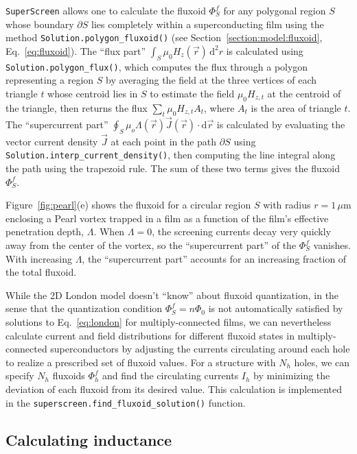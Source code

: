 \documentclass[final,3p,times,twocolumn]{elsarticle}
\newcommand{\inline}[1]{\texttt{#1}\xspace}
\newcommand{\SuperScreen}{\inline{SuperScreen}}
\newcommand{\um}{\mu\mathrm{m}}
\begin{document}
\SuperScreen allows one to calculate the fluxoid $\Phi^f_S$ for any polygonal region $S$ whose boundary $\partial S$ lies completely within a superconducting film using the method \inline{Solution.polygon_fluxoid()} (see Section~\ref{section:model:fluxoid}, Eq.~\ref{eq:fluxoid}). The ``flux part''  $\int_S\mu_0H_z(\vec{r})\,\mathrm{d}^2r$ is calculated using \inline{Solution.polygon_flux()}, which computes the flux through a polygon representing a region $S$ by averaging the field at the three vertices of each triangle $t$ whose centroid lies in $S$ to estimate the field $\mu_0H_{z, t}$ at the centroid of the triangle, then returns the flux $\sum_t \mu_0H_{z,t}A_t$, where $A_t$ is the area of triangle $t$. The ``supercurrent part'' $\oint_S\mu_o\Lambda(\vec{r})\vec{J}(\vec{r})\cdot\mathrm{d}\vec{r}$ is calculated by evaluating the vector current density $\vec{J}$ at each point in the path $\partial S$ using \inline{Solution.interp_current_density()}, then computing the line integral along the path using the trapezoid rule. The sum of these two terms gives the fluxoid $\Phi^f_S$.

Figure~\ref{fig:pearl}(e) shows the fluxoid for a circular region $S$ with radius $r=1\,\um$ enclosing a Pearl vortex trapped in a film as a function of the film's effective penetration depth, $\Lambda$. When $\Lambda=0$, the screening currents decay very quickly away from the center of the vortex, so the ``supercurrent part'' of the $\Phi^f_S$ vanishes. With increasing $\Lambda$, the ``supercurrent part'' accounts for an increasing fraction of the total fluxoid.

While the 2D London model doesn't ``know'' about fluxoid quantization, in the sense that the quantization condition $\Phi^f_S=n\Phi_0$ is not automatically satisfied by solutions to Eq.~\ref{eq:london} for multiply-connected films, we can nevertheless calculate current and field distributions for different fluxoid states in multiply-connected superconductors by adjusting the currents circulating around each hole to realize a prescribed set of fluxoid values. For a structure with $N_h$ holes, we can specify $N_h$ fluxoids $\Phi^f_h$ and find the circulating currents $I_h$ by minimizing the deviation of each fluxoid from its desired value. This calculation is implemented in the \inline{superscreen.find_fluxoid_solution()} function.

\subsection{Calculating inductance}
\label{section:examples:inductance}
\end{document}
